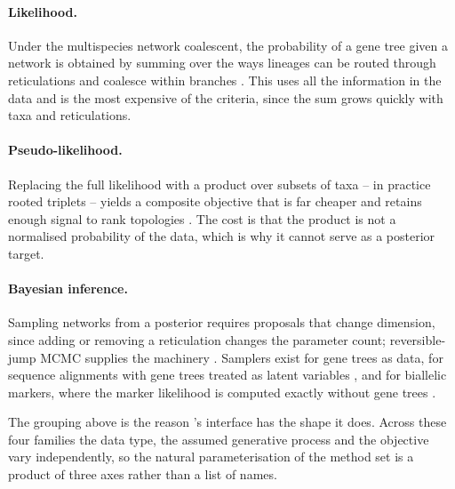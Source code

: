 \paragraph{Likelihood.} Under the multispecies network coalescent, the
probability of a gene tree given a network is obtained by summing over the ways
lineages can be routed through reticulations and coalesce within branches
\cite{Yu2014ML}. This uses all the information in the data and is the most
expensive of the criteria, since the sum grows quickly with taxa and
reticulations.

\paragraph{Pseudo-likelihood.} Replacing the full likelihood with a product over
subsets of taxa -- in practice rooted triplets -- yields a composite objective
that is far cheaper and retains enough signal to rank topologies
\cite{Yu2015MPL}. The cost is that the product is not a normalised probability of
the data, which is why it cannot serve as a posterior target.

\paragraph{Bayesian inference.} Sampling networks from a posterior requires
proposals that change dimension, since adding or removing a reticulation changes
the parameter count; reversible-jump MCMC supplies the machinery
\cite{Green1995RJMCMC, Hastings1970}. Samplers exist for gene trees as data, for
sequence alignments with gene trees treated as latent variables
\cite{Wen2018MCMCSEQ}, and for biallelic markers, where the marker likelihood is
computed exactly without gene trees \cite{Bryant2012SNAPP, Zhu2018BiMarkers}.

The grouping above is the reason \phynetpy's interface has the shape it does.
Across these four families the data type, the assumed generative process and the
objective vary independently, so the natural parameterisation of the method set
is a product of three axes rather than a list of names.
